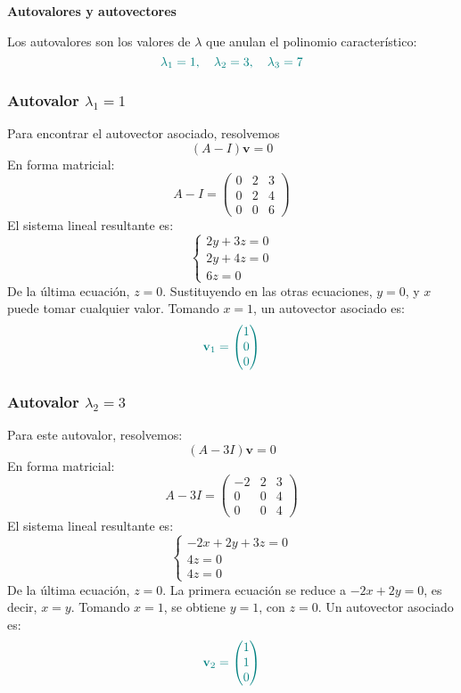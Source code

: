 \documentclass{article}
\begin{document}
\begin{enumerate}[label=\textbf{\alph*)}]
\textbf{Autovalores y autovectores}

Los autovalores son los valores de \( \lambda \) que anulan el polinomio característico:
\[\color{teal}
\lambda_1 = 1, \quad \lambda_2 = 3, \quad \lambda_3 = 7
\]

\subsubsection*{Autovalor \( \lambda_1 = 1 \)}

Para encontrar el autovector asociado, resolvemos
\[
(A - I)\mathbf{v} = 0
\]
En forma matricial:
\[
A - I = 
\begin{pmatrix}
0 & 2 & 3 \\
0 & 2 & 4 \\
0 & 0 & 6
\end{pmatrix}
\]
El sistema lineal resultante es:
\[
\begin{cases}
2y + 3z = 0 \\
2y + 4z = 0 \\
6z = 0
\end{cases}
\]
De la última ecuación, \( z = 0 \). Sustituyendo en las otras ecuaciones, \( y = 0 \), y \( x \) puede tomar cualquier valor. Tomando \( x = 1 \), un autovector asociado es:
\[\color{teal}
\mathbf{v}_1 = \begin{pmatrix} 1 \\ 0 \\ 0 \end{pmatrix}
\]

\subsubsection*{Autovalor \( \lambda_2 = 3 \)}

Para este autovalor, resolvemos:
\[
(A - 3I)\mathbf{v} = 0
\]
En forma matricial:
\[
A - 3I = 
\begin{pmatrix}
-2 & 2 & 3 \\
0 & 0 & 4 \\
0 & 0 & 4
\end{pmatrix}
\]
El sistema lineal resultante es:
\[
\begin{cases}
-2x + 2y + 3z = 0 \\
4z = 0 \\
4z = 0
\end{cases}
\]
De la última ecuación, \( z = 0 \). La primera ecuación se reduce a \( -2x + 2y = 0 \), es decir, \( x = y \). Tomando \( x = 1 \), se obtiene \( y = 1 \), con \( z = 0 \). Un autovector asociado es:
\[\color{teal}
\mathbf{v}_2 = \begin{pmatrix} 1 \\ 1 \\ 0 \end{pmatrix}
\]


\end{enumerate}
\end{document}
